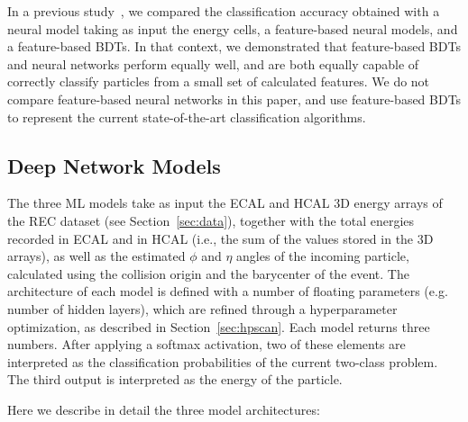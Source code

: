 In a previous study~\cite{NIPS}, we compared the classification accuracy obtained with a neural model taking as input the energy cells, a feature-based neural models, and a feature-based BDTs. In that context, we demonstrated that feature-based BDTs and neural networks perform equally well, and are both equally capable of correctly classify particles from a small set of calculated features. 
We do not compare feature-based neural networks in this paper, and use feature-based BDTs to represent the current state-of-the-art classification algorithms.

\subsection{Deep Network Models}

The three ML models take as input the ECAL and HCAL 3D energy arrays of the REC dataset (see Section~\ref{sec:data}), together with the total energies recorded in ECAL and in HCAL (i.e., the sum of the values stored in the 3D arrays), as well as the estimated $\phi$ and $\eta$ angles of the incoming particle, calculated using the collision origin and the barycenter of the event. The architecture of each model is defined with a number of floating parameters (e.g. number of hidden layers), which are refined through a hyperparameter optimization, as described in Section~\ref{sec:hpscan}. Each model returns three numbers. After applying a softmax activation, two of these elements are interpreted as the classification probabilities of the current two-class problem. The third output is interpreted as the energy of the particle.

Here we describe in detail the three model architectures:

